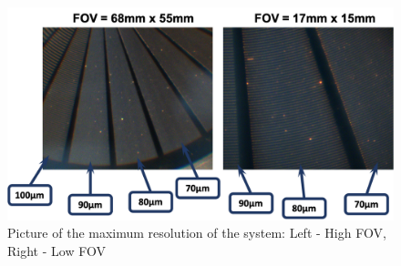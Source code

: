 \begin{figure}
\begin{center}
\includegraphics[width=12cm]{Pictures/ResulutionResult}
\caption[Picture of the maximum resolution of the system]{Picture of the maximum resolution of the system: Left - High FOV, Right - Low FOV}
\label{ResuRes}
\end{center}
\end{figure}












